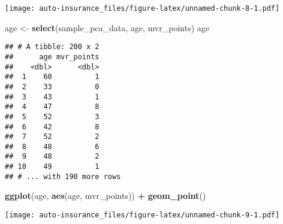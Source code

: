 \documentclass[]{article}
\newenvironment{Shaded}{\begin{snugshade}}{\end{snugshade}}
\newcommand{\KeywordTok}[1]{\textcolor[rgb]{0.13,0.29,0.53}{\textbf{#1}}}
\newcommand{\StringTok}[1]{\textcolor[rgb]{0.31,0.60,0.02}{#1}}
\newcommand{\OperatorTok}[1]{\textcolor[rgb]{0.81,0.36,0.00}{\textbf{#1}}}
\newcommand{\NormalTok}[1]{#1}
\begin{document}
\texttt{[image: auto-insurance\_files/figure-latex/unnamed-chunk-8-1.pdf]}

\begin{Shaded}
\begin{Highlighting}[]
\NormalTok{age <-}\StringTok{ }\KeywordTok{select}\NormalTok{(sample_pca_data, age, mvr_points)}
\NormalTok{age}
\end{Highlighting}
\end{Shaded}

\begin{verbatim}
## # A tibble: 200 x 2
##      age mvr_points
##    <dbl>      <dbl>
##  1    60          1
##  2    33          0
##  3    43          1
##  4    47          8
##  5    52          3
##  6    42          8
##  7    52          2
##  8    48          6
##  9    48          2
## 10    49          1
## # ... with 190 more rows
\end{verbatim}

\begin{Shaded}
\begin{Highlighting}[]
\KeywordTok{ggplot}\NormalTok{(age, }\KeywordTok{aes}\NormalTok{(age, mvr_points)) }\OperatorTok{+}\StringTok{ }\KeywordTok{geom_point}\NormalTok{()}
\end{Highlighting}
\end{Shaded}

\texttt{[image: auto-insurance\_files/figure-latex/unnamed-chunk-9-1.pdf]}
\end{document}
